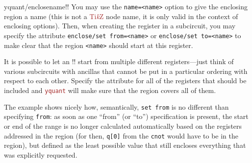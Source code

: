 \documentclass{scrartcl}
\makeatletter
\let\unpatched@minted@inline@iii=\minted@inline@iii%
\def\patched@minted@inline@iii#1{%
      \unpatched@minted@inline@iii{#1}%
      \par%
      \endgroup\egroup\nopagebreak\vskip-\parskip\nopagebreak%
      \noindent\ignorespaces%
   }
\def\patch@mintinline{%
      \let\minted@inline@iii=\patched@minted@inline@iii%
   }
\let\unpatched@RobustMintInlineProcess@ii=\RobustMintInlineProcess@ii
\def\patched@RobustMintInlineProcess@ii#1{%
      \unpatched@RobustMintInlineProcess@ii{#1}%
      \par%
      \endgroup\egroup\nopagebreak\vskip-\parskip\nopagebreak%
      \noindent\ignorespaces%
   }
\def\patch@mintinline{%
      \let\RobustMintInlineProcess@ii=\patched@RobustMintInlineProcess@ii%
   }
\newenvironment{option*}[3][]{\ifhmode\par\fi\addvspace{5mm}%
   \vbox\bgroup\begingroup%
      \patch@mintinline%
      \raggedleft%
      \hspace*{-1cm}%
      \phantomsection\label{yquant:/#2/#3}%
      \texttt{\ifstrempty{#1}\relax{\compat{#1}}\textcolor{gray}{/#2/}\textcolor{mintgreen}{#3}}\hfill default: %
      \tex}{\par\addvspace{5mm}}
\newenvironment{codeexample*}{%
   \VerbatimEnvironment%
   \let\FVB@VerbatimOut\minted@FVB@VerbatimOut
   \let\FVE@VerbatimOut\minted@FVE@VerbatimOut
   \minted@configlang{tex}%
   \minted@fvset
   \begin{VerbatimOut}[codes={\catcode`\^^I=12},firstline,lastline]{\minted@jobname.pyg}%
}{
   \end{VerbatimOut}%
   \minted@langlinenoson%
   \begin{adjustbox}{center}
       \minted@jobname.pyg %
   \end{adjustbox}\nopagebreak
   \expandafter\minted@pygmentize\expandafter{\minted@lang}%
   \minted@langlinenosoff%
   \par%
}
\def\TikZ{\textcolor{brown}{Ti\textit kZ}}
\def\pkg#1{\textcolor{brown}{\texttt{#1}}}
\def\ttlink{\link\texttt}
\def\Yquant{\pkg{yquant}}
\makeatother
\begin{document}
            \begin{option*}{yquant/enclose}{name}!!
               You may use the \texttt{name=<name>} option to give the enclosing region a name (this is not a \TikZ{} node name, it is only valid in the context of enclosing options).
               Then, when creating the register in a subcircuit, you may specify the attribute \texttt{enclose/set from=<name>} or \texttt{enclose/set to=<name>} to make clear that the region \texttt{<name>} should start at this register.
            \end{option*}

            It is possible to let an \tex!\enclose! start from multiple different registers---just think of various subcircuits with ancillas that cannot be put in a particular ordering with respect to each other.
            Specify the attribute for all of the registers that should be included and \Yquant{} will make sure that the region covers all of them.

            \clearpage
            \begin{example}
               \begin{codeexample*}
               \end{codeexample*}
               The example shows nicely how, semantically, \texttt{set from} is no different than specifying \texttt{from}: as soon as one ``from'' (or ``to'') specification is present, the start or end of the range is no longer calculated automatically based on the registers addressed in the region (for then, \texttt{q[0]} from the \ttlink{cnot} would have to be in the region), but defined as the least possible value that still encloses everything that was explicitly requested.
            \end{example}
\end{document}
